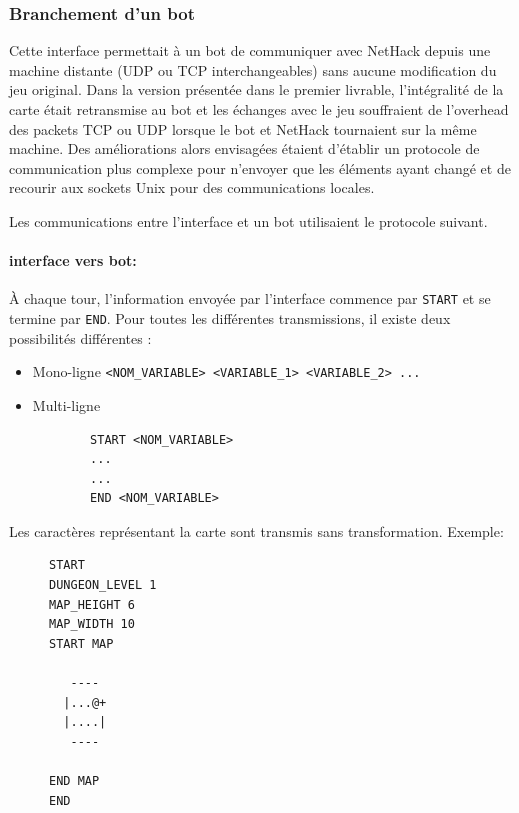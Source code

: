 \documentclass[a4paper,12pt]{article}
\begin{document}
\subsubsection*{Branchement d'un bot}

Cette interface permettait à un bot de communiquer avec NetHack depuis une
machine distante (UDP ou TCP interchangeables) sans aucune modification du jeu
original. Dans la version présentée dans le premier livrable, l'intégralité de
la carte était retransmise au bot et les échanges avec le jeu souffraient de
l'overhead des packets TCP ou UDP lorsque le bot et NetHack tournaient sur la
même machine. Des améliorations alors envisagées étaient d'établir un
protocole de communication plus complexe pour n'envoyer que les éléments ayant
changé et de recourir aux sockets Unix pour des communications locales.

Les communications entre l'interface et un bot utilisaient le protocole
suivant.

\paragraph{interface vers bot:} À chaque tour, l'information envoyée par
l'interface commence par \verb!START! et se termine par \verb!END!. Pour
toutes les différentes transmissions, il existe deux possibilités différentes
:
\begin{itemize}
	\item Mono-ligne \verb!<NOM_VARIABLE> <VARIABLE_1> <VARIABLE_2> ...!
	\item Multi-ligne
		\begin{verbatim}
		START <NOM_VARIABLE>
		...
		...
		END <NOM_VARIABLE>
		\end{verbatim}
\end{itemize}
Les caractères représentant la carte sont transmis sans transformation. Exemple:
\begin{figure}[H]
\begin{verbatim}
START
DUNGEON_LEVEL 1
MAP_HEIGHT 6
MAP_WIDTH 10
START MAP
          
   ----   
  |...@+  
  |....|  
   ----   
          
END MAP
END
\end{verbatim}
\end{figure}
\end{document}
